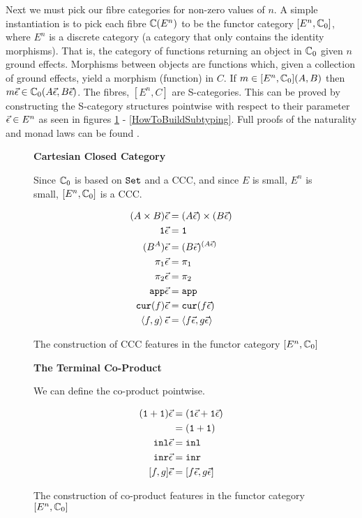 \documentclass{Report}
\begin{document}
Next we must pick our fibre categories for non-zero values of $n$. A simple instantiation is to pick each fibre $\mathbb{C}(E^n)$ to be the functor category $[E^n, \mathbb{C}_0]$,  where $E^n$ is a discrete category (a category that only contains the identity morphisms). That is, the category of functions returning an object in $\mathbb{C}_0$ given $n$ ground effects. Morphisms between objects are functions which, given a collection of ground effects, yield a morphism (function) in $C$. If $m\in [E^n, \mathbb{C}_0](A, B)$ then $m\vec{\epsilon}\in\mathbb{C}_0(A\vec{\epsilon}, B\vec{\epsilon})$. The fibres, $[E^n, C]$ are S-categories. This can be proved by constructing the S-category structures pointwise with respect to their parameter $\vec{\epsilon} \in E^n$ as seen in figures \ref{HowToBuildCCC} - \ref{HowToBuildSubtyping}. Full proofs of the naturality and monad laws can be found \needsRef.



\begin{figure}
    
    \begin{framed}
        \centering\textbf{Cartesian Closed Category}

Since $\mathbb{C}_0$ is based on $\texttt{Set}$ and a CCC, and since $E$ is small, $E^n$ is small, $[E^n, \mathbb{C}_0]$ is a CCC.

\begin{align}
    (A\times B)\vec{\epsilon} & = (A\vec{\epsilon})\times(B\vec{\epsilon})\\
    \texttt{1}\vec{\epsilon} & = \texttt{1}\\
    (B^A)\vec{\epsilon} &= (B\vec{\epsilon})^{(A\vec{\epsilon})}\\
    \pi_1\vec{\epsilon} & = \pi_1\\
    \pi_2\vec{\epsilon} & = \pi_2\\
    \texttt{app}\vec{\epsilon} & = \texttt{app}\\
    \texttt{cur}(f)\vec{\epsilon} & = \texttt{cur}(f\vec{\epsilon})\\
    \left\langle f, g\right\rangle\vec{\epsilon} & = \left\langle f\vec{\epsilon}, g\vec{\epsilon}\right\rangle\\
\end{align}

\end{framed}
\caption{The construction of CCC features in the functor category $[E^n, \mathbb{C}_0]$}
\label{HowToBuildCCC}
\end{figure}

\begin{figure}
    
\begin{framed}
    \centering\textbf{The Terminal Co-Product}

We can define the co-product pointwise.

\begin{align}
    (\texttt{1} + \texttt{1})\vec{\epsilon} & = (\texttt{1}\vec{\epsilon} + \texttt{1}\vec{\epsilon})\\
    & = (\texttt{1} + \texttt{1})\\
    \texttt{inl}\vec{\epsilon} &= \texttt{inl}\\
    \texttt{inr}\vec{\epsilon} &= \texttt{inr}\\
    [f, g]\vec{\epsilon} &= [f\vec{\epsilon}, g\vec{\epsilon}]\\
\end{align}
\end{framed}
\caption{The construction of co-product features in the functor category $[E^n, \mathbb{C}_0]$}
\label{HowToBuildCoproduct}
\end{figure}
\end{document}
